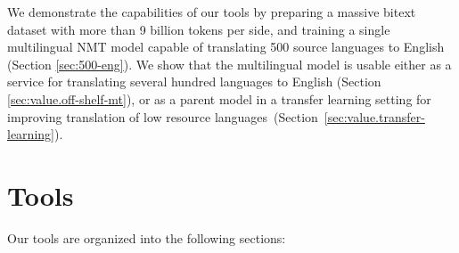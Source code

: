 We demonstrate the capabilities of our tools by preparing a massive bitext dataset with more than 9 billion tokens per side, and training a single multilingual NMT model capable of translating 500 source languages to English (Section \ref{sec:500-eng}).
We show that the multilingual model is usable either as a service for translating several hundred languages to English (Section \ref{sec:value.off-shelf-mt}), or as a parent model in a transfer learning setting for improving translation of low resource languages~(Section~\ref{sec:value.transfer-learning}). 


\section{Tools}
\label{sec:tools}
 Our tools are organized into the following sections:

